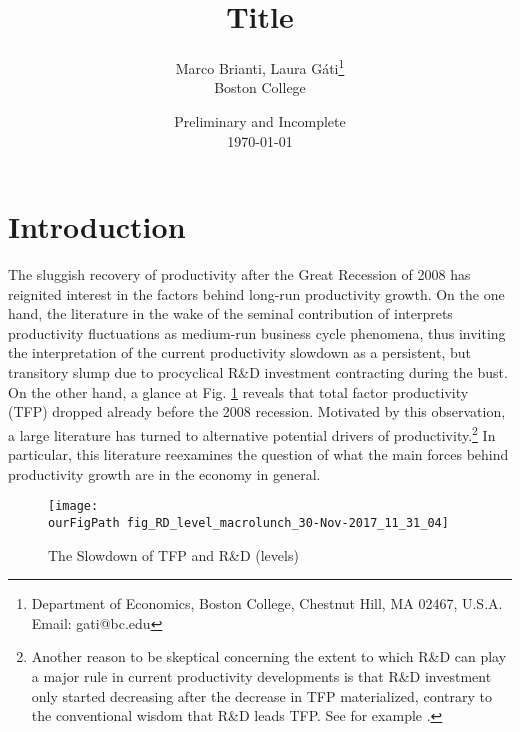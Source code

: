 \documentclass[11pt]{article}
\def \ourFigPath {../../Figures/}
\renewcommand{\[}{\begin{equation}}
\renewcommand{\]}{\end{equation}}
\begin{document}
\linespread{1.0}

\title{Title}
\author{Marco Brianti, Laura G\'ati\thanks{%
Department of Economics, Boston College, Chestnut Hill, MA 02467, U.S.A. Email: gati@bc.edu} \\
 Boston College \\
}
\date{Preliminary and Incomplete \\ \today}
\maketitle



\newpage
\section{Introduction}
The sluggish recovery of productivity after the Great Recession of 2008 has reignited interest in the factors behind long-run productivity growth. On the one hand, the literature in the wake of the seminal contribution of \cite{comin_gertler2006} interprets productivity fluctuations as medium-run business cycle phenomena, thus inviting the interpretation of the current productivity slowdown as a persistent, but transitory slump due to procyclical R\&D investment contracting during the bust. On the other hand, a glance at Fig. \ref{fig_slowdowns} reveals that total factor productivity (TFP) dropped already before the 2008 recession. Motivated by this observation, a large literature has turned to alternative potential drivers of productivity.\footnote{Another reason to be skeptical concerning the extent to which R\&D can play a major rule in current productivity developments is that R\&D investment only started decreasing after the decrease in TFP materialized, contrary to the conventional wisdom that R\&D leads TFP. See for example \cite{guerron_jinnai2013}.} In particular, this literature reexamines the question of what the main forces behind productivity growth are in the economy in general.

\begin{figure}[h!]
\centering
\caption{The Slowdown of TFP and R\&D (levels)}
\texttt{[image: \\ourFigPath fig\_RD\_level\_macrolunch\_30-Nov-2017\_11\_31\_04]}
\label{fig_slowdowns}
\end{figure}
\end{document}
